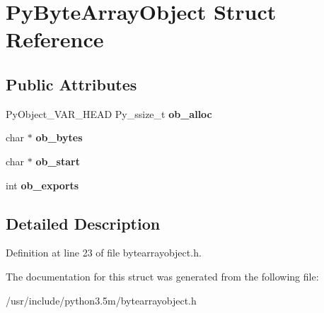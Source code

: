 \hypertarget{structPyByteArrayObject}{}\section{Py\+Byte\+Array\+Object Struct Reference}
\label{structPyByteArrayObject}
\subsection*{Public Attributes}
\begin{DoxyCompactItemize}
\item 
Py\+Object\+\_\+\+V\+A\+R\+\_\+\+H\+E\+AD Py\+\_\+ssize\+\_\+t {\bfseries ob\+\_\+alloc}\hypertarget{structPyByteArrayObject_ae9e8e60ced2248c151421e18fc630573}{}\label{structPyByteArrayObject_ae9e8e60ced2248c151421e18fc630573}

\item 
char $\ast$ {\bfseries ob\+\_\+bytes}\hypertarget{structPyByteArrayObject_a115f41ec4bbe6444f2331a8080a226e8}{}\label{structPyByteArrayObject_a115f41ec4bbe6444f2331a8080a226e8}

\item 
char $\ast$ {\bfseries ob\+\_\+start}\hypertarget{structPyByteArrayObject_abd53fdd36119094816638d33a5912d90}{}\label{structPyByteArrayObject_abd53fdd36119094816638d33a5912d90}

\item 
int {\bfseries ob\+\_\+exports}\hypertarget{structPyByteArrayObject_af4273dbc1589a575b55b3270eae0c9f4}{}\label{structPyByteArrayObject_af4273dbc1589a575b55b3270eae0c9f4}

\end{DoxyCompactItemize}


\subsection{Detailed Description}


Definition at line 23 of file bytearrayobject.\+h.



The documentation for this struct was generated from the following file\+:\begin{DoxyCompactItemize}
\item 
/usr/include/python3.\+5m/bytearrayobject.\+h\end{DoxyCompactItemize}
